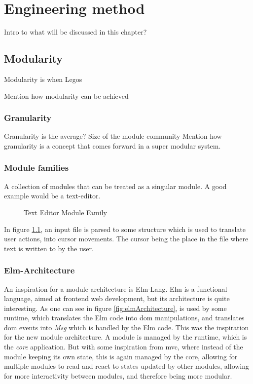 \chapter{Engineering method}


Intro to what will be discussed in this chapter?

\section{Modularity}

Modularity is when Legos

Mention how modularity can be achieved

\subsection{Granularity}

Granularity is the average? Size of the module community
Mention how granularity is a concept that comes forward in a super modular
system.

\subsection{Module families}

A collection of modules that can be treated as a singular module. A good example
would be a text-editor.
\begin{figure}
  \centering
  
  \caption{Text Editor Module Family}
  \label{fig:textEditorSimple}
\end{figure}

In figure \ref{fig:textEditorSimple}, an input file is parsed to some structure
which is used to translate user actions, into cursor movements. The cursor being
the place in the file where text is written to by the user.

\subsection{Elm-Architecture}

An inspiration for a module architecture is Elm-Lang. Elm is a functional
language, aimed at frontend web development, but its architecture is quite
interesting. As one can see in figure \ref{fig:elmArchitecture}, is used by some
runtime, which translates the Elm code into \gls{dom} manipulations, and translates
\gls{dom} events into \textit{Msg} which is handled by the Elm code. This was the
inspiration for the new module architecture. A module is managed by the runtime,
which is the \textit{core} application. But with some inspiration from
\gls{mvc}, where instead of the module keeping its own state, this is again
managed by the core, allowing for multiple modules to read and react to states
updated by other modules, allowing for more interactivity between modules, and
therefore being more modular.

